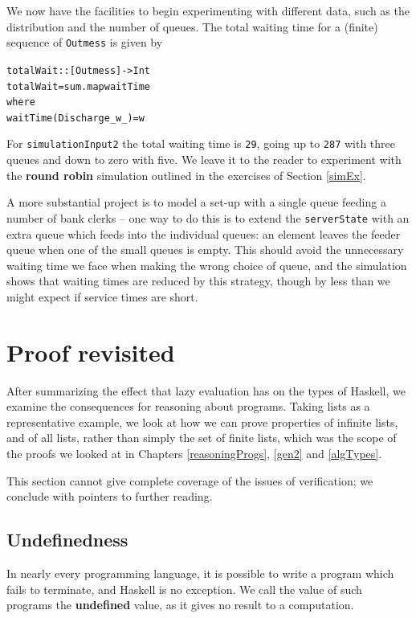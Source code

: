 We now have the facilities to begin experimenting with different data, such
as the distribution and the number of queues. The total waiting time for a
(finite) sequence of \texttt{Outmess} is given by
\begin{alltt}
totalWait :: [Outmess] -> Int
totalWait = sum . map waitTime
            where
            waitTime (Discharge _ w _) = w
\end{alltt}
For \texttt{simulationInput2} the total waiting time is \texttt{29}, going up to
\texttt{287} with three queues and down to zero with five. We leave it to the
reader to experiment with the \textbf{round robin} simulation outlined in the
exercises of Section \ref{simEx}.

A more substantial project is to model a set-up with a single queue feeding a
number of bank clerks -- one way to do this is to extend the 
\texttt{serverState} with an extra queue which feeds into the individual queues: an
element leaves the feeder queue when one of the small queues is empty. This
should avoid the unnecessary waiting time we face when making the wrong
choice of queue, and the simulation shows that waiting times are reduced by
this strategy, though by less than we might expect if service times are short.




\section{Proof revisited}
\label{lazyProof}

After summarizing the effect that lazy evaluation has on the types of
Haskell, we examine the consequences for reasoning about programs. Taking lists
as a representative example, we look at how we can prove properties of infinite
lists, and of all lists, rather than simply the set of finite
lists, which was the scope of the proofs we looked at in Chapters
\ref{reasoningProgs}, \ref{gen2} and \ref{algTypes}.

This section cannot give complete coverage of the issues of verification; we
conclude with pointers to further reading.

\subsection*{Undefinedness}

In nearly every programming language, it is possible to write a program which
fails to terminate, and Haskell is no exception. We call the value of such
programs the \textbf{undefined} value, as it gives no result to a computation.


